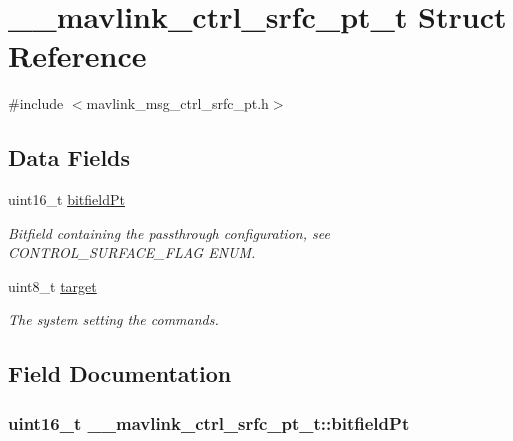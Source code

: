 \hypertarget{struct____mavlink__ctrl__srfc__pt__t}{\section{\+\_\+\+\_\+mavlink\+\_\+ctrl\+\_\+srfc\+\_\+pt\+\_\+t Struct Reference}
\label{struct____mavlink__ctrl__srfc__pt__t}
}


{\ttfamily \#include $<$mavlink\+\_\+msg\+\_\+ctrl\+\_\+srfc\+\_\+pt.\+h$>$}

\subsection*{Data Fields}
\begin{DoxyCompactItemize}
\item 
uint16\+\_\+t \hyperlink{struct____mavlink__ctrl__srfc__pt__t_acd7f5880cb7eb72bb013717ed3ec7057}{bitfield\+Pt}
\begin{DoxyCompactList}\small\item\em Bitfield containing the passthrough configuration, see C\+O\+N\+T\+R\+O\+L\+\_\+\+S\+U\+R\+F\+A\+C\+E\+\_\+\+F\+L\+A\+G E\+N\+U\+M. \end{DoxyCompactList}\item 
uint8\+\_\+t \hyperlink{struct____mavlink__ctrl__srfc__pt__t_a8748a29216947621736084640c306161}{target}
\begin{DoxyCompactList}\small\item\em The system setting the commands. \end{DoxyCompactList}\end{DoxyCompactItemize}


\subsection{Field Documentation}
\hypertarget{struct____mavlink__ctrl__srfc__pt__t_acd7f5880cb7eb72bb013717ed3ec7057}{
\subsubsection[{bitfield\+Pt}]{\setlength{\rightskip}{0pt plus 5cm}uint16\+\_\+t \+\_\+\+\_\+mavlink\+\_\+ctrl\+\_\+srfc\+\_\+pt\+\_\+t\+::bitfield\+Pt}}\label{struct____mavlink__ctrl__srfc__pt__t_acd7f5880cb7eb72bb013717ed3ec7057}


